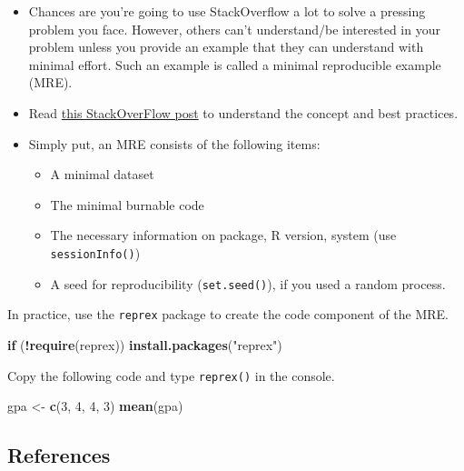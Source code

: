\documentclass[
]{book}
\newenvironment{Shaded}{\begin{snugshade}}{\end{snugshade}}
\newcommand{\ControlFlowTok}[1]{\textcolor[rgb]{0.13,0.29,0.53}{\textbf{#1}}}
\newcommand{\DecValTok}[1]{\textcolor[rgb]{0.00,0.00,0.81}{#1}}
\newcommand{\KeywordTok}[1]{\textcolor[rgb]{0.13,0.29,0.53}{\textbf{#1}}}
\newcommand{\NormalTok}[1]{#1}
\newcommand{\OperatorTok}[1]{\textcolor[rgb]{0.81,0.36,0.00}{\textbf{#1}}}
\newcommand{\StringTok}[1]{\textcolor[rgb]{0.31,0.60,0.02}{#1}}
\providecommand{\tightlist}{%
  \setlength{\itemsep}{0pt}\setlength{\parskip}{0pt}}
\begin{document}
\begin{itemize}
\item
  Chances are you're going to use StackOverflow a lot to solve a pressing problem you face. However, others can't understand/be interested in your problem unless you provide an example that they can understand with minimal effort. Such an example is called a minimal reproducible example (MRE).
\item
  Read \href{https://stackoverflow.com/questions/5963269/how-to-make-a-great-r-reproducible-example}{this StackOverFlow post} to understand the concept and best practices.
\item
  Simply put, an MRE consists of the following items:

  \begin{itemize}
  \tightlist
  \item
    A minimal dataset
  \item
    The minimal burnable code
  \item
    The necessary information on package, R version, system (use \texttt{sessionInfo()})
  \item
    A seed for reproducibility (\texttt{set.seed()}), if you used a random process.
  \end{itemize}
\end{itemize}

In practice, use the \texttt{reprex} package to create the code component of the MRE.

\begin{Shaded}
\begin{Highlighting}[]
\ControlFlowTok{if}\NormalTok{ (}\OperatorTok{!}\KeywordTok{require}\NormalTok{(reprex)) }\KeywordTok{install.packages}\NormalTok{(}\StringTok{"reprex"}\NormalTok{)}
\end{Highlighting}
\end{Shaded}

Copy the following code and type \texttt{reprex()} in the console.

\begin{Shaded}
\begin{Highlighting}[]
\NormalTok{gpa \textless{}{-}}\StringTok{ }\KeywordTok{c}\NormalTok{(}\DecValTok{3}\NormalTok{, }\DecValTok{4}\NormalTok{, }\DecValTok{4}\NormalTok{, }\DecValTok{3}\NormalTok{)}
\KeywordTok{mean}\NormalTok{(gpa)}
\end{Highlighting}
\end{Shaded}

\hypertarget{references-2}{%
\subsection{References}\label{references-2}}
\end{document}
